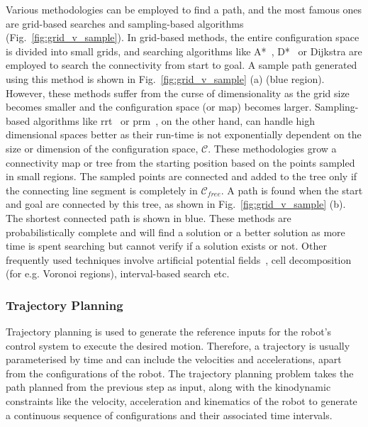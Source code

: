 Various methodologies can be employed to find a path, and the most famous ones are grid-based searches and sampling-based algorithms (Fig.~\ref{fig:grid_v_sample}). In grid-based methods, the entire configuration space is divided into small grids, and searching algorithms like A*~\cite{hart1968formal}, D*~\cite{stentz1997optimal} or Dijkstra are employed to search the connectivity from start to goal. A sample path generated using this method is shown in Fig.~\ref{fig:grid_v_sample} (a) (blue region). However, these methods suffer from the curse of dimensionality as the grid size becomes smaller and the configuration space (or map) becomes larger. Sampling-based algorithms like \acrshort{rrt}~\cite{lavalle1998rapidly} or \acrshort{prm}~\cite{kavraki1996probabilistic}, on the other hand, can handle high dimensional spaces better as their run-time is not exponentially dependent on the size or dimension of the configuration space, $\mathcal{C}$. These methodologies grow a connectivity map or tree from the starting position based on the points sampled in small regions. The sampled points are connected and added to the tree only if the connecting line segment is completely in $\mathcal{C}_{free}$. A path is found when the start and goal are connected by this tree, as shown in Fig.~\ref{fig:grid_v_sample} (b). The shortest connected path is shown in blue. These methods are probabilistically complete and will find a solution or a better solution as more time is spent searching but cannot verify if a solution exists or not. Other frequently used techniques involve artificial potential fields~\cite{vadakkepat2000evolutionary}, cell decomposition~\cite{garrido2006path} (for e.g. Voronoi regions), interval-based search etc. 


\subsubsection{Trajectory Planning}
Trajectory planning is used to generate the reference inputs for the robot's control system to execute the desired motion. Therefore, a trajectory is usually parameterised by time and can include the velocities and accelerations, apart from the configurations of the robot. The trajectory planning problem takes the path planned from the previous step as input, along with the kinodynamic constraints like the velocity, acceleration and kinematics of the robot to generate a continuous sequence of configurations and their associated time intervals. 

